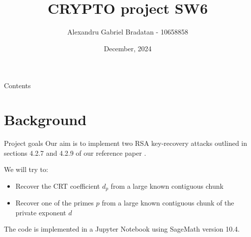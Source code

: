 \documentclass[usepdftitle=false]{beamer}
\title{CRYPTO project SW6}
\author{Alexandru Gabriel Bradatan - 10658858}
\date{December, 2024}
\begin{document}
\frame{\titlepage}

\begin{frame}{Contents}
\tableofcontents
\end{frame}

\section{Background}
\begin{frame}{Project goals}
Our aim is to implement two RSA key-recovery attacks outlined in sections 4.2.7 and 4.2.9 of 
our reference paper \cite{CiC-1-1-28}.

We will try to:
\begin{itemize}
    \item Recover the CRT coefficient $d_p$ from a large known contiguous chunk
    \item Recover one of the primes $p$ from a large known contiguous chunk of the private 
          exponent $d$
\end{itemize}

The code is implemented in a Jupyter Notebook using SageMath version 10.4.
\end{frame}
\end{document}
